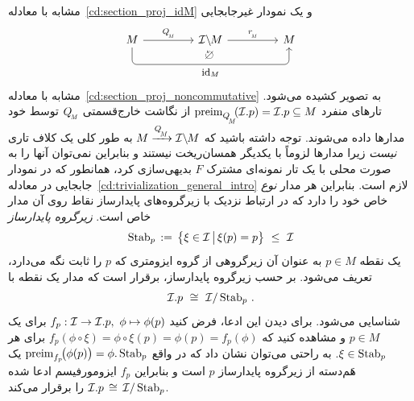 مشابه با معادله~\eqref{cd:section_proj_idM} و یک نمودار غیرجابجایی
\begin{equation}
\begin{tikzcd}[row sep=3em, column sep=4.5em,
               execute at end picture={
                    \node [] at (-.04, -.46) {$\noncommutative$};
                    }]
      M
            \arrow[r, "\QM"]
            \arrow[rr, rounded corners, to path={ 
                  -- ([yshift=-3.5ex]\tikztostart.south) 
                  --node[below, pos=.5]{\small$\id_M$} ([yshift=-3.5ex]\tikztotarget.south) 
                  -- (\tikztotarget.south)
                  }]
    & \IM
            \arrow[r, "\rM"]
    & M
\end{tikzcd}
\end{equation}
مشابه با معادله~\eqref{cd:section_proj_noncommutative} به تصویر کشیده می‌شود.
تارهای منفرد $\preim{\QM}\mkern-4mu(\I.p) = \I.p \subseteq M$ از نگاشت خارج‌قسمتی $\QM$ توسط خود مدارها داده می‌شوند.
توجه داشته باشید که $M\xrightarrow{\QM}\IM$ به طور کلی یک کلاف تاری \emph{نیست} زیرا مدارها لزوماً با یکدیگر همسان‌ریخت نیستند و بنابراین نمی‌توان آنها را به صورت محلی با یک تار نمونه‌ای مشترک $F$ بدیهی‌سازی کرد، همانطور که در نمودار جابجایی در معادله~\eqref{cd:trivialization_general_intro} لازم است.
بنابراین هر مدار \emph{نوع} خاص خود را دارد که در ارتباط نزدیک با زیرگروه‌های پایدارساز نقاط روی آن مدار خاص است.
\emph{زیرگروه پایدارساز}
\begin{align}
    \Stab{p} \,:=\, \big\{ \xi \in \I \,\big|\, \xi(p)=p \big\} \ \leq\ \I
\end{align}
یک نقطه $p\in M$ به عنوان آن زیرگروهی از گروه ایزومتری که $p$ را ثابت نگه می‌دارد، تعریف می‌شود.
بر حسب زیرگروه پایدارساز، برقرار است که مدار یک نقطه با
\begin{align}
    \mathcal{I}.p \ \cong\ \mathcal{I}/\operatorname{Stab}_{p} \,.
\end{align}
شناسایی می‌شود. برای دیدن این ادعا، فرض کنید $f_p: \mathcal{I} \to \mathcal{I}.p,\ \phi \mapsto \phi(p)$ برای یک $p\in M$ و مشاهده کنید که $f_p(\phi\circ\xi) = \phi\circ\xi(p) = \phi(p) = f_p(\phi)$ برای هر $\xi\in\operatorname{Stab}_{p}$.
به راحتی می‌توان نشان داد که در واقع $\operatorname{preim}_{f_p}\!\! \big(\phi(p)\big) = \phi.\operatorname{Stab}_{p}$ یک هَم‌دسته از زیرگروه پایدارساز $p$ است و بنابراین $f_p$ ایزومورفیسم ادعا شده $\mathcal{I}.p \,\cong\, \mathcal{I}/\operatorname{Stab}_{p}$ را برقرار می‌کند.

